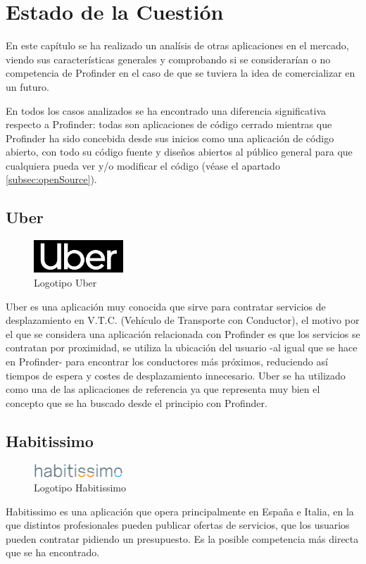 \chapter{Estado de la Cuestión}
\label{cap:estadoDeLaCuestion}
En este capítulo se ha realizado un analísis de otras aplicaciones en el mercado, viendo sus características generales y comprobando si se considerarían o no competencia de Profinder en el caso de que se tuviera la idea de comercializar en un futuro. 

En todos los casos analizados se ha encontrado una diferencia significativa respecto a Profinder: todas son aplicaciones de código cerrado mientras que Profinder ha sido concebida desde sus inicios como una aplicación de código abierto, con todo su código fuente y diseños abiertos al público general para que cualquiera pueda ver y/o modificar el código (véase el apartado \ref{subsec:openSource}).
\section{Uber}
\begin{figure}[h]
	\centering
	\includegraphics[width = 0.3\textwidth]{Imagenes/Fuentes/logo_Uber.png}
	\caption{Logotipo Uber}
	\label{fig:uber_logo}
\end{figure}
Uber\hyperlink{cap:biblio}{}
 es una aplicación muy conocida que sirve para contratar servicios de desplazamiento en V.T.C. (Vehículo de Transporte con Conductor), el motivo por el que se considera una aplicación relacionada con Profinder es que los servicios se contratan por proximidad, se utiliza la ubicación del usuario -al igual que se hace en Profinder- para encontrar los conductores más próximos, reduciendo así tiempos de espera y costes de desplazamiento innecesario. Uber se ha utilizado como una de las aplicaciones de referencia ya que representa muy bien el concepto que se ha buscado desde el principio con Profinder.
\newpage
\section{Habitissimo}
\begin{figure}[h]
	\centering
	\includegraphics[width = 0.3\textwidth]{Imagenes/Fuentes/habitissimo_logo.jpg}
	\caption{Logotipo Habitissimo}
	\label{fig:habitissimo_logo}
\end{figure}
Habitissimo\hyperlink{cap:biblio}{}
es una aplicación que opera principalmente en España e Italia, en la que distintos profesionales pueden publicar ofertas de servicios, que los usuarios pueden contratar pidiendo un presupuesto. Es la posible competencia más directa que se ha encontrado. 


